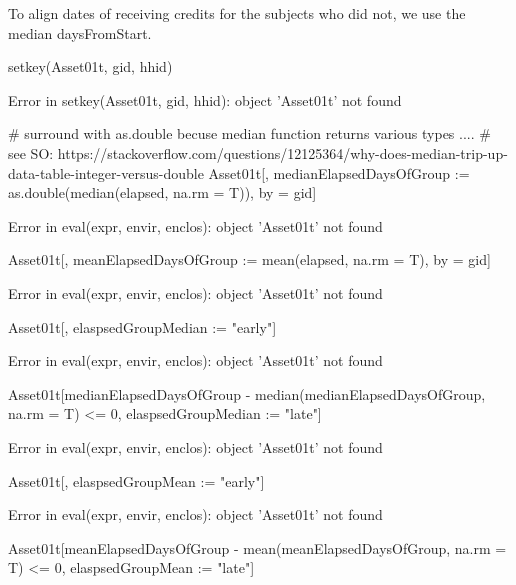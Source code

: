 To align dates of receiving credits for the subjects who did not, we use the median \textsf{daysFromStart}. 
\begin{Schunk}
\begin{Sinput}
setkey(Asset01t, gid, hhid)
\end{Sinput}
\begin{Soutput}
Error in setkey(Asset01t, gid, hhid): object 'Asset01t' not found
\end{Soutput}
\begin{Sinput}
# surround with as.double becuse median function returns various types ....
# see SO: https://stackoverflow.com/questions/12125364/why-does-median-trip-up-data-table-integer-versus-double
Asset01t[, medianElapsedDaysOfGroup := 
	as.double(median(elapsed, na.rm = T)), by = gid]
\end{Sinput}
\begin{Soutput}
Error in eval(expr, envir, enclos): object 'Asset01t' not found
\end{Soutput}
\begin{Sinput}
Asset01t[, meanElapsedDaysOfGroup := mean(elapsed, na.rm = T), by = gid]
\end{Sinput}
\begin{Soutput}
Error in eval(expr, envir, enclos): object 'Asset01t' not found
\end{Soutput}
\begin{Sinput}
Asset01t[, elaspsedGroupMedian := "early"]
\end{Sinput}
\begin{Soutput}
Error in eval(expr, envir, enclos): object 'Asset01t' not found
\end{Soutput}
\begin{Sinput}
Asset01t[medianElapsedDaysOfGroup - 
	median(medianElapsedDaysOfGroup, na.rm = T) <= 0, 
	elaspsedGroupMedian := "late"]
\end{Sinput}
\begin{Soutput}
Error in eval(expr, envir, enclos): object 'Asset01t' not found
\end{Soutput}
\begin{Sinput}
Asset01t[, elaspsedGroupMean := "early"]
\end{Sinput}
\begin{Soutput}
Error in eval(expr, envir, enclos): object 'Asset01t' not found
\end{Soutput}
\begin{Sinput}
Asset01t[meanElapsedDaysOfGroup - 
	mean(meanElapsedDaysOfGroup, na.rm = T) <= 0, 
	elaspsedGroupMean := "late"]

\end{Sinput}
\end{Schunk}
